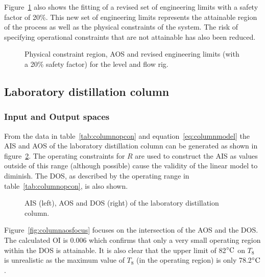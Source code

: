 Figure~\ref{fig:flowcontypes} also shows the fitting of a revised set of engineering limits with a safety factor of 20\%.
This new set of engineering limits represents the attainable region of the process as well as the physical constraints of the system.
The risk of specifying operational constraints that are not attainable has also been reduced.

\begin{figure}[htbp]
  \centering
    \scalebox{1}{}  
  \caption[Physical constraint region of level and flow rig]{Physical constraint region, AOS and revised engineering limits (with a 20\% safety factor) for the level and flow rig.}
  \label{fig:flowcontypes}
\end{figure}


\subsection{Laboratory distillation column}
\subsubsection{Input and Output spaces}
From the data in table~\ref{tab:columnopcon} and equation~\ref{eq:columnmodel} the AIS and AOS of the laboratory distillation column can be generated as shown in figure~\ref{fig:columnaisaos}.
The operating constraints for $R$ are used to construct the AIS as values outside of this range (although possible) cause the validity of the linear model to diminish.
The DOS, as described by the operating range in table~\ref{tab:columnopcon}, is also shown.

\begin{figure}[htbp]
  \centering
    \scalebox{1}{}  
    \scalebox{1}{}  
  \caption[AIS, AOS and DOS of the laboratory distillation column]{AIS (left), AOS and DOS (right) of the laboratory distillation column.}
  \label{fig:columnaisaos}
\end{figure}

Figure~\ref{fig:columnaosfocus} focuses on the intersection of the AOS and the DOS.
The calculated OI is 0.006 which confirms that only a very small operating region within the DOS is attainable.
It is also clear that the upper limit of 82$^{\circ}\text{{C}}$ on $T_8$ is unrealistic as the maximum value of $T_8$ (in the operating region) is only 78.2$^{\circ}\text{{C}}$.

